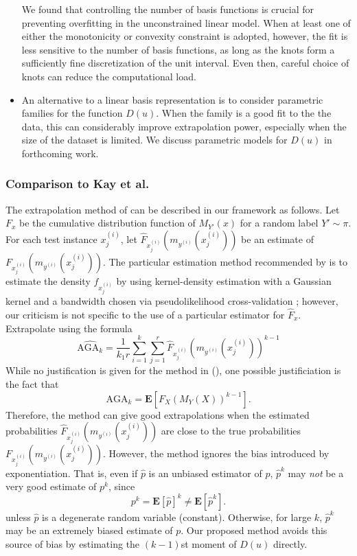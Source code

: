 \documentclass[twoside,11pt]{article}
\newcommand{\E}{\textbf{E}}
\begin{document}
\begin{itemize}
We found that controlling the number of basis functions is crucial for preventing overfitting in the unconstrained linear model. When
at least one of either the monotonicity or convexity constraint is
adopted, however, the fit is less sensitive to the number of basis
functions, as long as the knots form a sufficiently fine
discretization of the unit interval.  Even then, careful choice of knots can reduce the computational load.
\item An alternative to a linear basis representation is to
consider parametric families for the function ${D}(u)$.  When the
family is a good fit to the the data, this can considerably improve
extrapolation power, especially when the size of the dataset is
limited.  We discuss parametric models for ${D}(u)$ in
forthcoming work.
\end{itemize}

\subsubsection*{Comparison to Kay et al.}
The extrapolation method of \cite{Kay2008a} can be described in our
framework as follows.  Let $F_x$ be the cumulative distribution
function of $M_{Y'}(x)$ for a random label $Y' \sim \pi$.  For each
test instance $x^{(i)}_j$, let
$\hat{F}_{x^{(i)}_j}(m_{y^{(i)}}(x^{(i)}_j))$ be an estimate of
$F_{x^{(i)}_j}(m_{y^{(i)}}(x^{(i)}_j))$.  The particular estimation
method recommended by \citep{Kay2008a} is to estimate the density
$f_{x^{(i)}_j}$ by using kernel-density estimation with a Gaussian
kernel and a bandwidth chosen via pseudolikelihood cross-validation
\citep{cao1994comparative}; however, our criticism is not specific to
the use of a particular estimator for $\hat{F}_x$.  Extrapolate using
the formula
\[
\widehat{\text{AGA}_k} = \frac{1}{k_1 r} \sum_{i=1}^k \sum_{j=1}^r \hat{F}_{x^{(i)}_j}(m_{y^{(i)}}(x^{(i)}_j))^{k-1}
\]
While no justification is given for the method in (\cite{Kay2008a}),  one possible justificiation is the fact that
\[\text{AGA}_k = \E[F_X(M_{Y}(X))^{k-1}].\]
Therefore, the method can give good extrapolations when the estimated
probabilities $\hat{F}_{x^{(i)}_j}(m_{y^{(i)}}(x^{(i)}_j))$ are close
to the true probabilities $F_{x^{(i)}_j}(m_{y^{(i)}}(x^{(i)}_j))$.
However, the method ignores the bias introduced by exponentiation.
That is, even if $\hat{p}$ is an unbiased estimator of $p$, $\hat{p}^k$ may \emph{not} be a very good estimate of $p^k$, since
\[
p^k = \E[\hat{p}]^k \neq \E[\hat{p}^k].
\]
unless $\hat{p}$ is a degenerate random variable
(constant). Otherwise, for large $k$, $\hat{p}^k$ may be an extremely
biased estimate of $p$.  Our proposed method avoids this source of
bias by estimating the $(k-1)$st moment of $D(u)$ directly.
\end{document}
